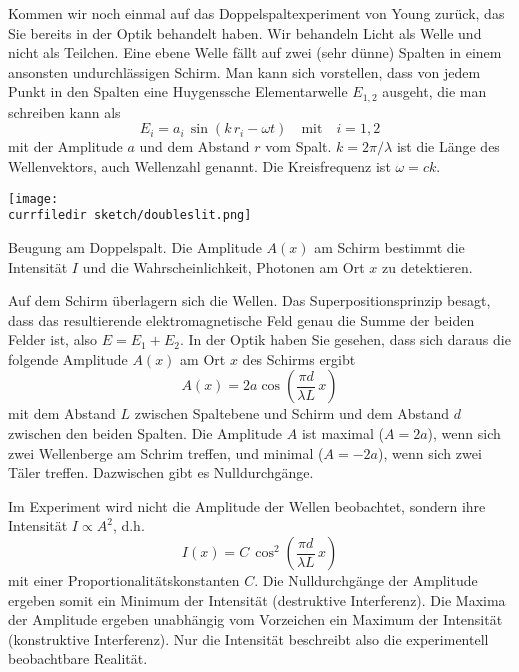 Kommen wir noch einmal auf das Doppelspaltexperiment von Young zurück, das Sie bereits in der Optik behandelt haben. Wir behandeln Licht als Welle und nicht als Teilchen. Eine ebene Welle fällt auf zwei (sehr dünne) Spalten in einem ansonsten undurchlässigen Schirm. Man kann sich vorstellen, dass von jedem Punkt in den Spalten eine Huygenssche Elementarwelle $E_{1,2}$ ausgeht, die man schreiben kann als 
\begin{equation}
    E_{i} = a_i \, \sin ( k \, r_i - \omega t) \quad \text{mit} \quad i = 1,2
\end{equation}
mit der Amplitude $a$ und dem Abstand $r$ vom Spalt. $k = 2 \pi / \lambda $ ist die Länge des Wellenvektors, auch Wellenzahl genannt.
Die Kreisfrequenz ist $\omega = c k$.


\begin{marginfigure}
    \texttt{[image: \\currfiledir sketch/doubleslit.png]}
    \caption{Beugung am Doppelspalt. Die Amplitude $A(x)$ am Schirm bestimmt die Intensität $I$ und die Wahrscheinlichkeit, Photonen am Ort $x$ zu detektieren.}
    \label{fig:3_Doppelspalt}
\end{marginfigure}


Auf dem Schirm überlagern sich die Wellen. Das Superpositionsprinzip besagt, dass das resultierende elektromagnetische Feld genau die Summe der beiden Felder ist, also $E = E_1 + E_2$. In der Optik haben Sie gesehen, dass sich daraus die folgende Amplitude $A(x)$ am Ort $x$ des Schirms ergibt
\begin{equation}
    A(x) = 2 a\cos \left( \frac{\pi d}{\lambda L} \, x \right)
\end{equation}
mit dem Abstand $L$ zwischen Spaltebene und Schirm und dem Abstand $d$ zwischen den beiden Spalten. Die Amplitude $A$ ist maximal ($A = 2a$), wenn sich zwei Wellenberge am Schrim treffen, und minimal ($A = -2 a$), wenn sich zwei Täler treffen.  Dazwischen gibt es Nulldurchgänge. 

Im Experiment wird nicht die Amplitude der Wellen beobachtet, sondern ihre Intensität $I \propto A^2$, d.h.
\begin{equation}
    I(x) = C \, \cos^2 \left( \frac{\pi d}{\lambda L} \, x \right)
\end{equation}
mit einer Proportionalitätskonstanten $C$. Die Nulldurchgänge der Amplitude ergeben somit ein Minimum der Intensität (destruktive Interferenz). Die Maxima der Amplitude ergeben unabhängig vom Vorzeichen ein Maximum der Intensität (konstruktive Interferenz). Nur die Intensität beschreibt also die experimentell beobachtbare Realität.


